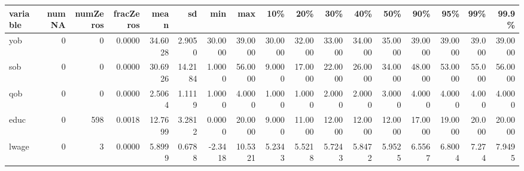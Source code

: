 
\begin{tabular}{lrrrrrrrrrrrrrrrr}
\toprule
variable & numNA & numZeros & fracZeros & mean & sd & min & max & 10\% & 20\% & 30\% & 40\% & 50\% & 90\% & 95\% & 99\% & 99.9\%\\
\midrule
yob & 0 & 0 & 0.0000 & 34.6028 & 2.9050 & 30.0000 & 39.0000 & 30.0000 & 32.0000 & 33.0000 & 34.0000 & 35.0000 & 39.0000 & 39.0000 & 39.000 & 39.0000\\
sob & 0 & 0 & 0.0000 & 30.6926 & 14.2184 & 1.0000 & 56.0000 & 9.0000 & 17.0000 & 22.0000 & 26.0000 & 34.0000 & 48.0000 & 53.0000 & 55.000 & 56.0000\\
qob & 0 & 0 & 0.0000 & 2.5064 & 1.1119 & 1.0000 & 4.0000 & 1.0000 & 1.0000 & 2.0000 & 2.0000 & 3.0000 & 4.0000 & 4.0000 & 4.000 & 4.0000\\
educ & 0 & 598 & 0.0018 & 12.7699 & 3.2812 & 0.0000 & 20.0000 & 9.0000 & 11.0000 & 12.0000 & 12.0000 & 12.0000 & 17.0000 & 19.0000 & 20.000 & 20.0000\\
lwage & 0 & 3 & 0.0000 & 5.8999 & 0.6788 & -2.3418 & 10.5321 & 5.2343 & 5.5218 & 5.7243 & 5.8472 & 5.9525 & 6.5567 & 6.8004 & 7.274 & 7.9495\\
\bottomrule
\end{tabular}
